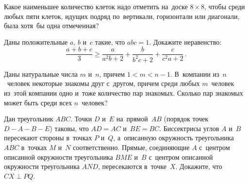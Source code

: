 


\begin{problems}

\item
Какое наименьшее количество клеток надо отметить на~доске $8 \times 8$, чтобы
среди любых пяти клеток, идущих подряд по~вертикали, горизонтали или диагонали,
была хотя~бы одна отмеченная?

\item
Даны положительные $a$, $b$ и~$c$ такие, что $a b c = 1$.
Докажите неравенство:
\[
    \frac{a + b + c}{3}
\geq
    \frac{a}{a^2b + 2} + \frac{b}{b^2c + 2} + \frac{c}{c^2a + 2}
\, . \]

\item
Даны натуральные числа $m$ и~$n$, причем $1 < m < n - 1$.
В~компании из~$n$~человек некоторые знакомы друг с~другом, причем среди любых
$m$~человек из~этой компании одно и~тоже количество пар знакомых.
Сколько пар знакомых может быть среди всех $n$~человек?

\item
Дан треугольник $ABC$.
Точки $D$ и~$E$ на~прямой~$AB$ (порядок точек $D {-} A {-} B {-} E$) таковы,
что $AD = AC$ и~$BE = BC$.
Биссектрисы углов $A$ и~$B$ пересекают стороны в~точках $P$ и~$Q$, а~описанную
окружность треугольника $ABC$ в~точках $M$ и~$N$ соответственно.
Прямые, соединяющие $A$ с~центром описанной окружности треугольника $BME$ и~$B$
с~центром описанной окружности треугольника $AND$, пересекаются в~точке~$X$.
Докажите, что $CX \perp PQ$.

\end{problems}

